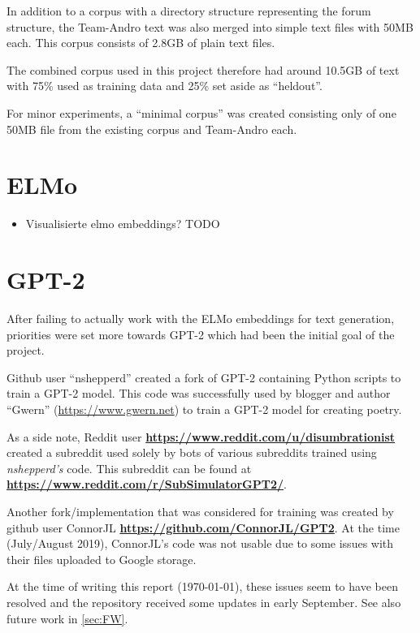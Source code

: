 \documentclass{scrartcl}
\newcommand{\burl}[1]{\textbf{\url{#1}}}
\begin{document}
In addition to a corpus with a directory structure representing the forum structure, the Team-Andro text was also merged into simple text files with 50MB each. This corpus consists of 2.8GB of plain text files.

The combined corpus used in this project therefore had around 10.5GB of text with 75\% used as training data and 25\% set aside as \enquote{heldout}.

For minor experiments, a \enquote{minimal corpus} was created consisting only of one 50MB file from the existing corpus and Team-Andro each.



\section{ELMo}
\cite{Peters:2018}

\begin{itemize}
	\item Visualisierte elmo embeddings? TODO
\end{itemize}

\section{GPT-2}
After failing to actually work with the ELMo embeddings for text generation, priorities were set more towards GPT-2 which had been the initial goal of the project.



\cite{radford2019language}

Github user \enquote{nshepperd} created a fork of GPT-2 containing Python scripts to train a GPT-2 model. This code was successfully used by blogger and author \enquote{Gwern} (\url{https://www.gwern.net}) to train a GPT-2 model for creating poetry.

As a side note, Reddit user \burl{https://www.reddit.com/u/disumbrationist} created a subreddit used solely by bots of various subreddits trained using \textit{nshepperd's} code. This subreddit can be found at \burl{https://www.reddit.com/r/SubSimulatorGPT2/}.

Another fork/implementation that was considered for training was created by github user ConnorJL \burl{https://github.com/ConnorJL/GPT2}. At the time (July/August 2019), ConnorJL's code was not usable due to some issues with their files uploaded to Google storage.

At the time of writing this report (\today), these issues seem to have been resolved and the repository received some updates in early September. See  also future work in \cref{sec:FW}.
\end{document}
